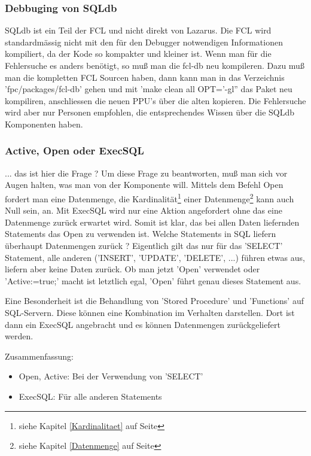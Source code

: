 \subsubsection{Debbuging von SQLdb}
SQLdb ist ein Teil der FCL und nicht direkt von Lazarus. Die FCL wird standardmässig nicht mit den für den Debugger notwendigen Informationen kompiliert, da der Kode so kompakter und kleiner ist. Wenn man für die Fehlersuche es anders benötigt, so muß man die fcl-db neu kompileren. Dazu muß man die kompletten FCL Sourcen haben, dann kann man in das Verzeichnis 'fpc/packages/fcl-db' gehen und mit 'make clean all OPT='-gl'' das Paket neu kompiliren, anschliessen die neuen PPU's über die alten kopieren. Die Fehlersuche wird aber nur Personen empfohlen, die entsprechendes Wissen über die SQLdb Komponenten haben.

\subsubsection{Active, Open oder ExecSQL}
... das ist hier die Frage ? Um diese Frage zu beantworten, muß man sich vor Augen halten, was man von der Komponente will. Mittels dem Befehl Open fordert man eine Datenmenge, die Kardinalität\footnote{siehe Kapitel \ref{Kardinalitaet} auf Seite \pageref{Kardinalitaet}} einer Datenmenge\footnote{siehe Kapitel \ref{Datenmenge} auf Seite \pageref{Datenmenge}} kann auch Null sein, an. Mit ExecSQL wird nur eine Aktion angefordert ohne das eine Datenmenge zurück erwartet wird. 
Somit ist klar, das bei allen Daten liefernden Statements das Open zu verwenden ist. Welche Statements in SQL liefern überhaupt Datenmengen zurück ? Eigentlich gilt das nur für das 'SELECT' Statement, alle anderen ('INSERT', 'UPDATE', 'DELETE', ...) führen etwas aus, liefern aber keine Daten zurück. Ob man jetzt 'Open' verwendet oder 'Active:=true;' macht ist letztlich egal, 'Open' führt genau dieses Statement aus.  

Eine Besonderheit ist die Behandlung von 'Stored Procedure' und 'Functions' auf SQL-Servern. Diese können eine Kombination im Verhalten darstellen. Dort ist dann ein ExecSQL angebracht und es können Datenmengen zurückgeliefert werden.

Zusammenfassung:
\begin{itemize}
	\item Open, Active: Bei der Verwendung von 'SELECT'
	\item ExecSQL: Für alle anderen Statements 
\end{itemize}

